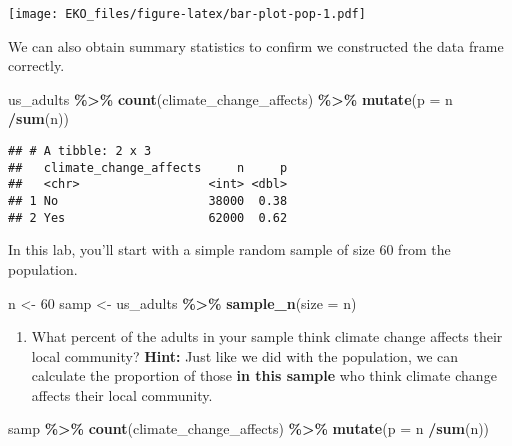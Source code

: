 \documentclass[
]{article}
\newenvironment{Shaded}{\begin{snugshade}}{\end{snugshade}}
\newcommand{\AttributeTok}[1]{\textcolor[rgb]{0.13,0.29,0.53}{#1}}
\newcommand{\DecValTok}[1]{\textcolor[rgb]{0.00,0.00,0.81}{#1}}
\newcommand{\FunctionTok}[1]{\textcolor[rgb]{0.13,0.29,0.53}{\textbf{#1}}}
\newcommand{\NormalTok}[1]{#1}
\newcommand{\OtherTok}[1]{\textcolor[rgb]{0.56,0.35,0.01}{#1}}
\newcommand{\SpecialCharTok}[1]{\textcolor[rgb]{0.81,0.36,0.00}{\textbf{#1}}}
\providecommand{\tightlist}{%
  \setlength{\itemsep}{0pt}\setlength{\parskip}{0pt}}
\begin{document}
\texttt{[image: EKO\_files/figure-latex/bar-plot-pop-1.pdf]}

We can also obtain summary statistics to confirm we constructed the data
frame correctly.

\begin{Shaded}
\begin{Highlighting}[]
\NormalTok{us\_adults }\SpecialCharTok{\%\textgreater{}\%}
  \FunctionTok{count}\NormalTok{(climate\_change\_affects) }\SpecialCharTok{\%\textgreater{}\%}
  \FunctionTok{mutate}\NormalTok{(}\AttributeTok{p =}\NormalTok{ n }\SpecialCharTok{/}\FunctionTok{sum}\NormalTok{(n))}
\end{Highlighting}
\end{Shaded}

\begin{verbatim}
## # A tibble: 2 x 3
##   climate_change_affects     n     p
##   <chr>                  <int> <dbl>
## 1 No                     38000  0.38
## 2 Yes                    62000  0.62
\end{verbatim}

In this lab, you'll start with a simple random sample of size 60 from
the population.

\begin{Shaded}
\begin{Highlighting}[]
\NormalTok{n }\OtherTok{\textless{}{-}} \DecValTok{60}
\NormalTok{samp }\OtherTok{\textless{}{-}}\NormalTok{ us\_adults }\SpecialCharTok{\%\textgreater{}\%}
  \FunctionTok{sample\_n}\NormalTok{(}\AttributeTok{size =}\NormalTok{ n)}
\end{Highlighting}
\end{Shaded}

\begin{enumerate}
\def\labelenumi{\arabic{enumi}.}
\tightlist
\item
  What percent of the adults in your sample think climate change affects
  their local community? \textbf{Hint:} Just like we did with the
  population, we can calculate the proportion of those \textbf{in this
  sample} who think climate change affects their local community.
\end{enumerate}

\begin{Shaded}
\begin{Highlighting}[]
\NormalTok{samp }\SpecialCharTok{\%\textgreater{}\%}
  \FunctionTok{count}\NormalTok{(climate\_change\_affects) }\SpecialCharTok{\%\textgreater{}\%}
  \FunctionTok{mutate}\NormalTok{(}\AttributeTok{p =}\NormalTok{ n }\SpecialCharTok{/}\FunctionTok{sum}\NormalTok{(n))}
\end{Highlighting}
\end{Shaded}
\end{document}
